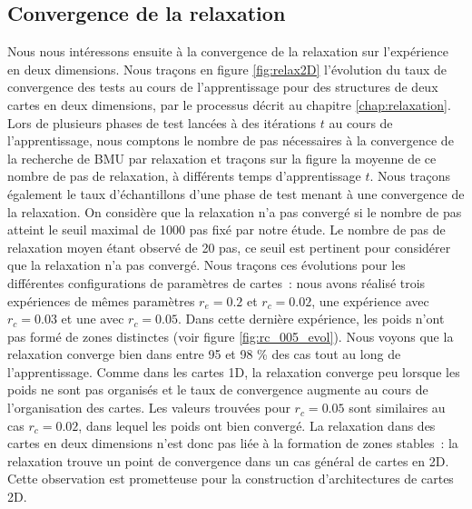 \documentclass[../main]{subfiles}
\begin{document}

\subsection{Convergence de la relaxation \label{par:conv2D}}

Nous nous intéressons ensuite à la convergence de la relaxation sur l'expérience en deux dimensions. 
Nous traçons en figure \ref{fig:relax2D} l'évolution du taux de convergence des tests au cours de l'apprentissage pour des structures de deux cartes en deux dimensions, par le processus décrit au chapitre \ref{chap:relaxation}. Lors de plusieurs phases de test lancées à des itérations $t$ au cours de l'apprentissage, nous comptons le nombre de pas nécessaires à la convergence de la recherche de BMU par relaxation et traçons sur la figure la moyenne de ce nombre de pas de relaxation, à différents temps d'apprentissage $t$.
Nous traçons également le taux d'échantillons d'une phase de test menant à une convergence de la relaxation. On considère que la relaxation n'a pas convergé si le nombre de pas atteint le seuil maximal de 1000 pas fixé par notre étude. Le nombre de pas de relaxation moyen étant observé de 20 pas, ce seuil est pertinent pour considérer que la relaxation n'a pas convergé.
Nous traçons ces évolutions pour les différentes configurations de paramètres de cartes~: nous avons réalisé trois expériences de mêmes paramètres $r_e=0.2$ et $r_c = 0.02$, une expérience avec $r_c = 0.03$ et une avec $r_c = 0.05$. 
Dans cette dernière expérience, les poids n'ont pas formé de zones distinctes (voir figure \ref{fig:rc_005_evol}).
Nous voyons que la relaxation converge bien dans entre 95 et 98 \% des cas tout au long de l'apprentissage. Comme dans les cartes 1D, la relaxation converge peu lorsque les poids ne sont pas organisés et le taux de convergence augmente au cours de l'organisation des cartes.
Les valeurs trouvées pour $r_c = 0.05$ sont similaires au cas $r_c = 0.02$, dans lequel les poids ont bien convergé. La relaxation dans des cartes en deux dimensions n'est donc pas liée à la formation de zones stables~: la relaxation trouve un point de convergence dans un cas général de cartes en 2D.
Cette observation est prometteuse pour la construction d'architectures de cartes 2D.
\end{document}
